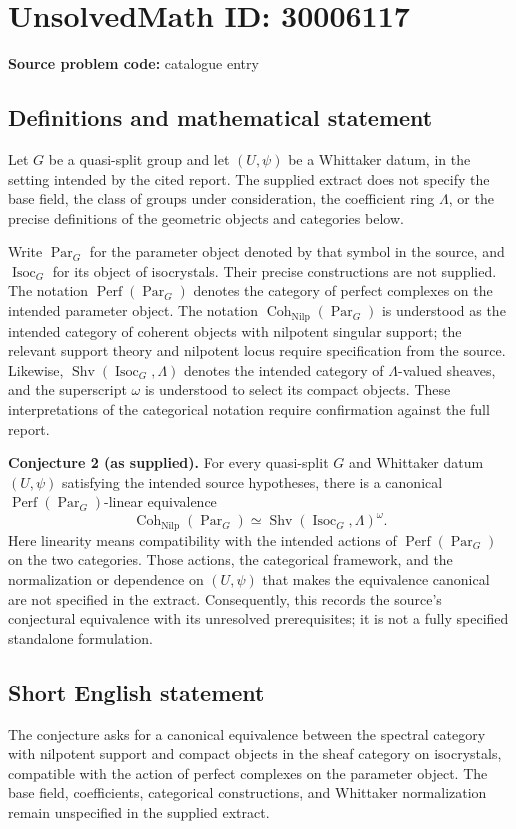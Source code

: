 \documentclass[11pt]{article}
\begin{document}
\section*{UnsolvedMath ID: 30006117}
\textbf{Source problem code:} catalogue entry
\subsection{Definitions and mathematical statement}
Let \(G\) be a quasi-split group and let \((U,\psi)\) be a Whittaker datum, in the setting intended by the cited report. The supplied extract does not specify the base field, the class of groups under consideration, the coefficient ring \(\Lambda\), or the precise definitions of the geometric objects and categories below.

Write \(\operatorname{Par}_G\) for the parameter object denoted by that symbol in the source, and \(\operatorname{Isoc}_G\) for its object of isocrystals. Their precise constructions are not supplied. The notation \(\operatorname{Perf}(\operatorname{Par}_G)\) denotes the category of perfect complexes on the intended parameter object. The notation \(\operatorname{Coh}_{\operatorname{Nilp}}(\operatorname{Par}_G)\) is understood as the intended category of coherent objects with nilpotent singular support; the relevant support theory and nilpotent locus require specification from the source. Likewise, \(\operatorname{Shv}(\operatorname{Isoc}_G,\Lambda)\) denotes the intended category of \(\Lambda\)-valued sheaves, and the superscript \(\omega\) is understood to select its compact objects. These interpretations of the categorical notation require confirmation against the full report.

\textbf{Conjecture 2 (as supplied).} For every quasi-split \(G\) and Whittaker datum \((U,\psi)\) satisfying the intended source hypotheses, there is a canonical \(\operatorname{Perf}(\operatorname{Par}_G)\)-linear equivalence
\[
\operatorname{Coh}_{\operatorname{Nilp}}(\operatorname{Par}_G)
\simeq
\operatorname{Shv}(\operatorname{Isoc}_G,\Lambda)^{\omega}.
\]
Here linearity means compatibility with the intended actions of \(\operatorname{Perf}(\operatorname{Par}_G)\) on the two categories. Those actions, the categorical framework, and the normalization or dependence on \((U,\psi)\) that makes the equivalence canonical are not specified in the extract. Consequently, this records the source's conjectural equivalence with its unresolved prerequisites; it is not a fully specified standalone formulation.
\subsection{Short English statement}
The conjecture asks for a canonical equivalence between the spectral category with nilpotent support and compact objects in the sheaf category on isocrystals, compatible with the action of perfect complexes on the parameter object. The base field, coefficients, categorical constructions, and Whittaker normalization remain unspecified in the supplied extract.
\end{document}
